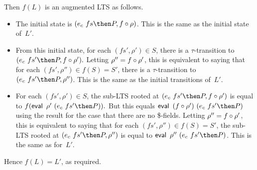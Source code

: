 %
Then $f(L)$ is an augmented LTS as follows.
\begin{itemize}
\item The initial state is
  $(e_c~fs \then P, f\after\rho)$.  This is the
  same as the initial state of~$L'$.

\item From this initial state, for each $(fs',\rho') \in S$, there is a
  $\tau$-transition to
  \(
  (e_c~fs' \then P, f\after\rho'). 
  \)
  Letting $\rho'' = f\circ\rho'$, this is equivalent to
  saying that for each $(fs',\rho'') \in f(S) = S'$, there is a
  $\tau$-transition to $(e_c~fs' \then P,\linebreak[1] \rho'')$.
  This is the same as the initial transitions of~$L'$.

\item For each $(fs',\rho') \in S$, the sub-LTS rooted at
  $(e_c~fs' \then  P,\linebreak[2]
    {f\after\rho'})$ is 
  equal to 
  \( f(\eval~\rho'~(e_c~fs' \then P)) . \)
  But this equals $\eval~{(f\after\rho')} ~ (e_c~fs' \then P)$
  using the result for the case that there are no \$-fields.
  Letting 
  $\rho'' = f\circ\rho'$, this is equivalent to saying that for each
  $(fs',\rho'') \in f(S) = S'$, the sub-LTS rooted at
  $(e_c~fs' \then P, \linebreak[2] \rho'')$ is equal to
  $\eval~\rho''~(e_c~fs' \then P)$.  This is the same as for~$L'$.
\end{itemize}
%
Hence $f(L) = L'$, as required.



